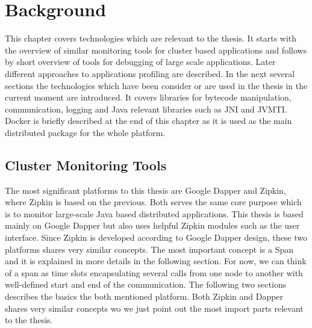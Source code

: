 \chapter{Background }
This chapter covers technologies which are relevant to the thesis. It starts with the overview of similar monitoring tools for cluster based applications and follows by short overview of tools for debugging of large scale applications. Later different approaches to applications profiling are described. 
In the next several sections the technologies which have been consider or are used in the thesis in the current moment are introduced. It covers libraries for bytecode manipulation, communication, logging and Java relevant libraries such as JNI and JVMTI. Docker is briefly described at the end of this chapter as it is used as the main distributed package for the whole platform.

\section{Cluster Monitoring Tools}
The most significant platforms to this thesis are Google Dapper and Zipkin, where Zipkin is based on the previous. Both serves the same core purpose which is to monitor large-scale Java based distributed applications. This thesis is based mainly on Google Dapper but also uses helpful Zipkin modules such as the user interface. Since Zipkin is developed according to Google Dapper design, these two platforms shares very similar concepts. The most important concept is a Span and it is explained in more details in the  following section. For now, we can think of a span as time slots encapsulating several calls from one node to another with well-defined start and end of the communication. The following two sections describes the basics the both mentioned platform. Both Zipkin and Dapper shares very similar concepts wo we just point out the most import parts relevant to the thesis.
